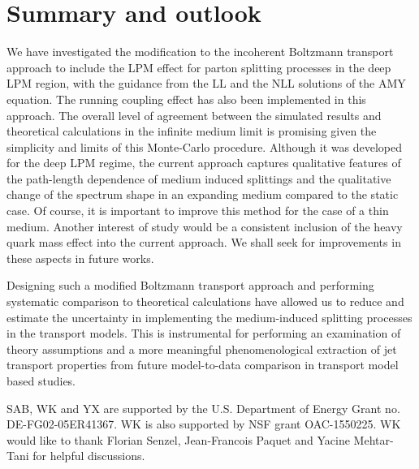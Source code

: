 \documentclass[aps, prc, reprint, amsmath, groupedaddress, nofootinbib]{revtex4-1}
\begin{document}
\section{Summary and outlook}\label{section:summary}
We have investigated the modification to the incoherent Boltzmann transport approach to include the LPM effect for parton splitting processes in the deep LPM region, with the guidance from the LL and the NLL solutions of the AMY equation.
The running coupling effect has also been implemented in this approach.
The overall level of agreement between the simulated results and theoretical calculations in the infinite medium limit is promising given the simplicity and limits of this Monte-Carlo procedure. 
Although it was developed for the deep LPM regime, the current approach captures qualitative features of the path-length dependence of medium induced splittings and the qualitative change of the spectrum shape in an expanding medium compared to the static case.
Of course, it is important to improve this method for the case of a thin medium.
Another interest of study would be a consistent inclusion of the heavy quark mass effect into the current approach.
We shall seek for improvements in these aspects in future works.

Designing such a modified Boltzmann transport approach and performing systematic comparison to theoretical calculations have allowed us to reduce and estimate the uncertainty in implementing the medium-induced splitting processes in the transport models. 
This is instrumental for performing an examination of theory assumptions and a more meaningful phenomenological extraction of jet transport properties from future model-to-data comparison in transport model based studies.

\begin{acknowledgments}
SAB, WK and YX are supported by the U.S. Department of Energy Grant no. DE-FG02-05ER41367. WK is also supported by NSF grant OAC-1550225.
WK would like to thank Florian Senzel, Jean-Francois Paquet and Yacine Mehtar-Tani for helpful discussions.
\end{acknowledgments}
\end{document}
